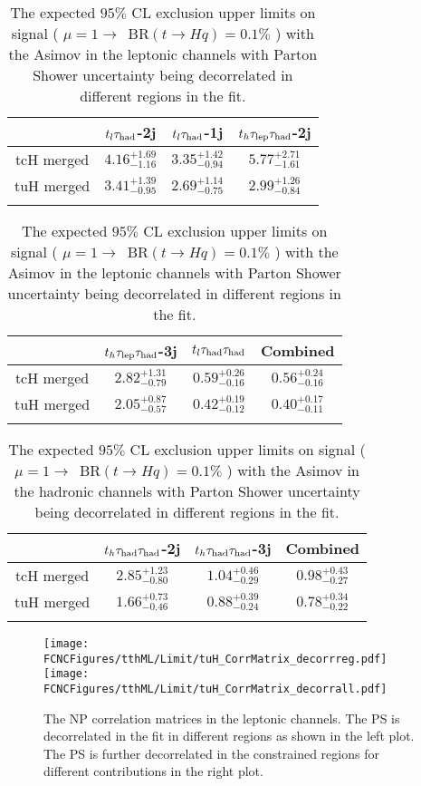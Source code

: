 \begin{table}
\centering
\begin{tabular}{cccc} \toprule\toprule
 & $t_l\tau_\text{had}$-2j & $t_l\tau_\text{had}$-1j & $t_h\tau_\text{lep}{}\tau_\text{had}$-2j\\\midrule
tcH merged & $4.16^{+1.69}_{-1.16}$ & $3.35^{+1.42}_{-0.94}$ & $5.77^{+2.71}_{-1.61}$\\
tuH merged & $3.41^{+1.39}_{-0.95}$ & $2.69^{+1.14}_{-0.75}$ & $2.99^{+1.26}_{-0.84}$\\
\bottomrule\bottomrule\\
\end{tabular}
\begin{tabular}{cccc} \toprule\toprule
 & $t_h\tau_\text{lep}{}\tau_\text{had}$-3j & $t_l\tau_\text{had}{}\tau_\text{had}$ & Combined\\\midrule
tcH merged & $2.82^{+1.31}_{-0.79}$ & $0.59^{+0.26}_{-0.16}$ & $0.56^{+0.24}_{-0.16}$\\
tuH merged & $2.05^{+0.87}_{-0.57}$ & $0.42^{+0.19}_{-0.12}$ & $0.40^{+0.17}_{-0.11}$\\
\bottomrule\bottomrule\\
\end{tabular}
\caption{The expected $95\%$ CL exclusion upper limits on signal ( $\mu=1\to$~BR$(t\to Hq)=0.1\%$ ) with the Asimov in the leptonic channels with Parton Shower uncertainty being decorrelated in different regions in the fit.} 
\label{tab:tthML_deco_limit}
\end{table}



\begin{table}
\centering
\begin{tabular}{cccc} \toprule\toprule
 & $t_h\tau_\text{had}{}\tau_\text{had}$-2j & $t_h\tau_\text{had}{}\tau_\text{had}$-3j & Combined\\\midrule
tcH merged & $2.85^{+1.23}_{-0.80}$ & $1.04^{+0.46}_{-0.29}$ & $0.98^{+0.43}_{-0.27}$\\
tuH merged & $1.66^{+0.73}_{-0.46}$ & $0.88^{+0.39}_{-0.24}$ & $0.78^{+0.34}_{-0.22}$\\
\bottomrule\bottomrule\\
\end{tabular}
\caption{The expected $95\%$ CL exclusion upper limits on signal ( $\mu=1\to$~BR$(t\to Hq)=0.1\%$ ) with the Asimov in the hadronic channels with Parton Shower uncertainty being decorrelated in different regions in the fit.} 
\label{tab:xTFW_deco_limit}
\end{table}




\begin{figure}[H]
\centering
\texttt{[image: \\FCNCFigures/tthML/Limit/tuH\_CorrMatrix\_decorrreg.pdf]}
\texttt{[image: \\FCNCFigures/tthML/Limit/tuH\_CorrMatrix\_decorrall.pdf]}
\caption{ The NP correlation matrices in the leptonic channels. The PS is decorrelated in the fit in different regions as shown in the left plot. The PS is further decorrelated in the constrained regions for different contributions in the right plot. }
\label{fig:tuH_CorrMatrix_decorr}
\end{figure}


